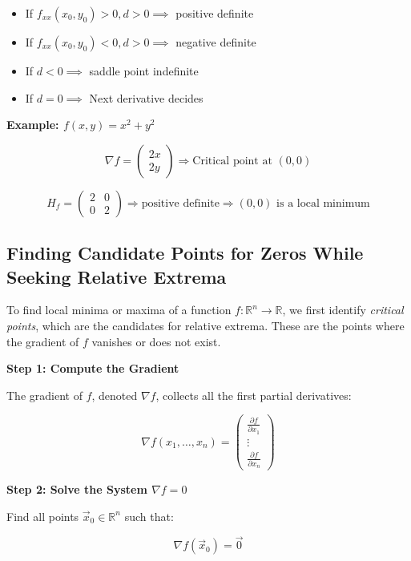 \begin{itemize}[label=\(-\)]
    \item If \(f_{xx}(x_0, y_0) > 0, d > 0 \implies\) positive definite
    \item If \(f_{xx}(x_0, y_0) < 0, d > 0 \implies\) negative definite
    \item If \(d < 0 \implies \) saddle point indefinite
    \item If \(d = 0 \implies \) Next derivative decides
\end{itemize}

\textbf{Example: \( f(x, y) = x^2 + y^2 \)}

\[
\nabla f = \begin{pmatrix} 2x \\ 2y \end{pmatrix} \Rightarrow \text{Critical point at } (0, 0)
\]

\[
H_f = \begin{pmatrix} 2 & 0 \\ 0 & 2 \end{pmatrix} \Rightarrow \text{positive definite}
\Rightarrow (0, 0) \text{ is a local minimum}
\]

\subsection{Finding Candidate Points for Zeros While Seeking Relative Extrema}

To find local minima or maxima of a function \( f : \mathbb{R}^n \to \mathbb{R} \), we first identify 
\emph{critical points}, which are the candidates for relative extrema. 
These are the points where the gradient of \( f \) vanishes or does not exist.

\textbf{Step 1: Compute the Gradient}

The gradient of \( f \), denoted \( \nabla f \), collects all the first partial derivatives:

\[
\nabla f(x_1, \dots, x_n) =
\begin{pmatrix}
\frac{\partial f}{\partial x_1} \\
\vdots \\
\frac{\partial f}{\partial x_n}
\end{pmatrix}
\]

\textbf{Step 2: Solve the System \( \nabla f = 0 \)}

Find all points \( \vec{x}_0 \in \mathbb{R}^n \) such that:

\[
\nabla f(\vec{x}_0) = \vec{0}
\]

